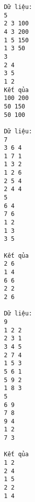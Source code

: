 \begin{verbatim}
Dữ liệu:
5
2 3 100
4 3 200
1 5 150
1 3 50
3
2 4
3 5
1 2
Kết qủa
100 200
50 150
50 100

Dữ liệu:
7
3 6 4
1 7 1
1 3 2
1 2 6
2 5 4
2 4 4
5
6 4
7 6
1 2
1 3
3 5

Kết qủa
2 6
1 4
6 6
2 2
2 6

Dữ liệu:
9
1 2 2
2 3 1
3 4 5
2 7 4
1 5 3
5 6 1
5 9 2
1 8 3
5
6 9
7 8
9 4
1 2
7 3

Kết qủa
1 2
2 4
1 5
2 2
1 4
\end{verbatim}